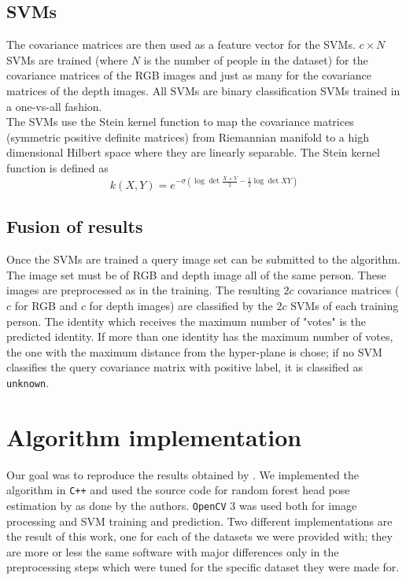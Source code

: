 \documentclass{article}
\begin{document}
	\subsection{SVMs}\label{sec:svm}
	The covariance matrices are then used as a feature vector for the SVMs. $c \times N$ SVMs are trained (where $N$ is the number of people in the dataset) for the covariance matrices of the RGB images and just as many for the covariance matrices of the depth images. All SVMs are binary classification SVMs trained in a one-vs-all fashion. \\
	The SVMs use the Stein kernel function to map the covariance matrices (symmetric positive definite matrices) from Riemannian manifold to a high dimensional Hilbert space where they are linearly separable. The Stein kernel function is defined as 
	$$k(X,Y) = e^{-\sigma (\log{\det{\frac{X+Y}{2}}} - \frac{1}{2}\log{\det{XY}})}$$

	\subsection{Fusion of results}
	Once the SVMs are trained a query image set can be submitted to the algorithm. The image set must be of RGB and depth image all of the same person. These images are preprocessed as in the training. The resulting $2c$ covariance matrices ($c$ for RGB and $c$ for depth images) are classified by the $2c$ SVMs of each training person. The identity which receives the maximum number of "votes" is the predicted identity.
	If more than one identity has the maximum number of votes, the one with the maximum distance from the hyper-plane is chose; if no SVM classifies the query covariance matrix with positive label, it is classified as \verb|unknown|.

\section{Algorithm implementation}\label{sec:algorithm_impl}
Our goal was to reproduce the results obtained by \citep{Hayat2016}. We implemented the algorithm in \verb|C++| and used the source code for random forest head pose estimation by \citep{Fanelli2013} as done by the authors. \verb|OpenCV| 3 was used both for image processing and SVM training and prediction. Two different implementations are the result of this work, one for each of the datasets we were provided with; they are more or less the same software with major differences only in the preprocessing steps which were tuned for the specific dataset they were made for.
\end{document}
